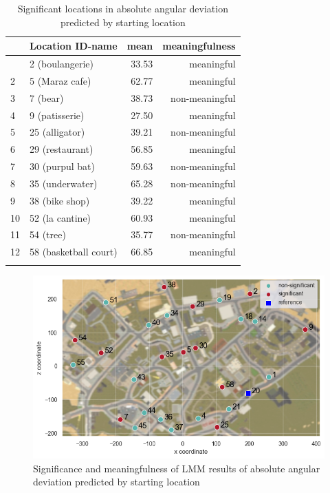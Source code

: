 \begin{table}[h]
	\begin{center}
		\caption[Significant locations in absolute angular deviation predicted by starting location]{Significant locations in absolute angular deviation predicted by starting location} \vspace{10pt}
		\begin{tabular}{p{1.5cm} l r r} 
			\hiderowcolors
			\hline \hline 
			{} & \setrow{\bfseries} Location ID-name & \setrow{\bfseries} mean & \setrow{\bfseries} meaningfulness \\ [.7ex] 
			\hline\hline
			\showrowcolors
			1 & 2 (boulangerie)		& 		33.53 		& meaningful	  \\ 
			2 & 5 (Maraz cafe)		& 		62.77	 	& meaningful 	  \\
			3 & 7 (bear) 			& 		38.73		& non-meaningful  \\
			4 & 9 (patisserie) 		& 		27.50 		& meaningful	  \\
			5 & 25 (alligator) 		& 		39.21 		& non-meaningful  \\ 
			6 & 29 (restaurant)		& 		56.85 		& meaningful  \\ 
			7 & 30 (purpul bat)		& 		59.63 		& non-meaningful  \\ 
			8 & 35 (underwater)		& 		65.28 		& non-meaningful  \\
			9 & 38 (bike shop)		& 		39.22 		& meaningful  \\
			10 & 52 (la cantine)		& 		60.93 		& meaningful  \\
			11 & 54 (tree)			& 		35.77 		& non-meaningful  \\
			12 & 58 (basketball court)		& 		66.85 		& meaningful  \\ 		[1ex]
			\hiderowcolors \hline \hline
		\end{tabular}
		\label{tab:sig_angle_loc}
	\end{center}
\end{table}

\begin{figure}[!htb]
	\centering
	\includegraphics[width=150mm]{figures/significance_starting_locations_angular_error_map_23.png}
	\caption[Significance and meaningfulness (absolute angular deviation predicted by starting location)]{Significance and meaningfulness of LMM results of absolute angular deviation predicted by starting location}
	\label{fig:sig_angle_loc_map}
\end{figure}

